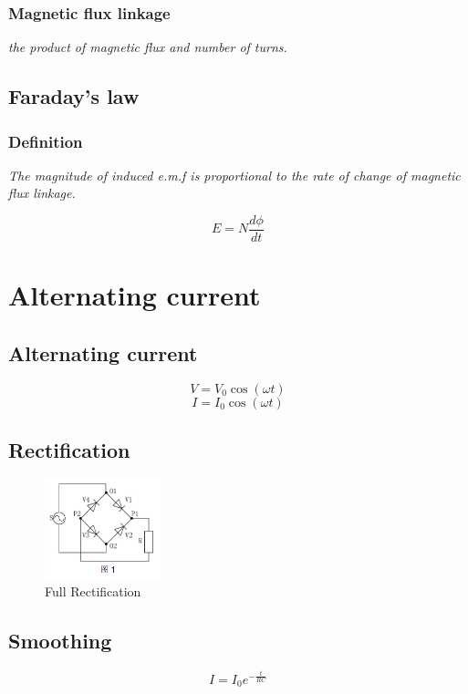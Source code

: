 \documentclass[a4paper,9pt]{scrartcl}
\begin{document}
    \subsubsection{Magnetic flux linkage}
    \textit{the product of magnetic flux and number of turns.}

    \subsection{Faraday's law}

    \subsubsection{Definition}
    \textit{The magnitude of induced e.m.f is proportional to the rate of change of magnetic flux linkage.}

    \begin{displaymath}
        E = N\frac{d\phi}{dt}
    \end{displaymath}


    \section{Alternating current}

    \subsection{Alternating current}
    \begin{displaymath}
        V = V_0\cos({\omega}t)
    \end{displaymath}
    \begin{displaymath}
        I = I_0\cos({\omega}t)
    \end{displaymath}

    \subsection{Rectification}

    \begin{figure}[!htb]
        \centering
        \includegraphics[width=0.3\textwidth]{.images/FullRectification.png}
        \caption{Full Rectification}
    \end{figure}

    \subsection{Smoothing}

    \begin{displaymath}
        I = {I_0}e^{-\frac{t}{RC}}
    \end{displaymath}
\end{document}
